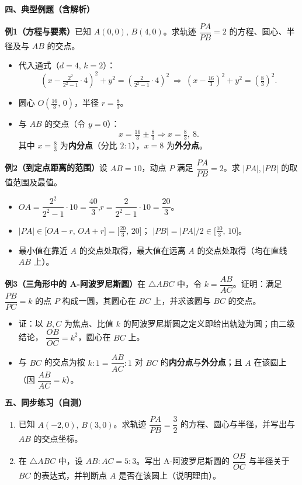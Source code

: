 \documentclass{article}
\begin{document}
   \textbf{四、典型例题（含解析）}
   
   \textbf{例1（方程与要素）}\quad 已知 \(A(0,0),\,B(4,0)\)。求轨迹 \(\dfrac{PA}{PB}=2\) 的方程、圆心、半径及与 \(AB\) 的交点。
   \begin{itemize}
   	\item 代入通式（\(d=4,\,k=2\)）：
   	\[
   	(x-\tfrac{2^2}{2^2-1}\cdot4)^2+y^2=\left(\tfrac{2}{2^2-1}\cdot4\right)^2
   	\ \Longrightarrow\
   	(x-\tfrac{16}{3})^2+y^2=\left(\tfrac{8}{3}\right)^2.
   	\]
   	\item 圆心 \(O\!\left(\tfrac{16}{3},\,0\right)\)，半径 \(r=\tfrac{8}{3}\)。
   	\item 与 \(AB\) 的交点（令 \(y=0\)）：
   	\[
   	x=\tfrac{16}{3}\pm\tfrac{8}{3}\Rightarrow x=\tfrac{8}{3},\ 8.
   	\]
   	其中 \(x=\tfrac{8}{3}\) 为\textbf{内分点}（分比 \(2:1\)），\(x=8\) 为\textbf{外分点}。
   \end{itemize}
   
   \textbf{例2（到定点距离的范围）}\quad 设 \(AB=10\)，动点 \(P\) 满足 \(\dfrac{PA}{PB}=2\)。求 \(\lvert PA\rvert,\lvert PB\rvert\) 的取值范围及最值。
   \begin{itemize}
   	\item \(OA=\dfrac{2^2}{2^2-1}\cdot10=\dfrac{40}{3}\),\quad \(r=\dfrac{2}{2^2-1}\cdot10=\dfrac{20}{3}\)。
   	\item \(\lvert PA\rvert\in\bigl[OA-r,\,OA+r\bigr]=\bigl[\tfrac{20}{3},\,20\bigr]\)；\quad
   	\(\lvert PB\rvert=\lvert PA\rvert/2\in\bigl[\tfrac{10}{3},\,10\bigr]\)。
   	\item 最小值在靠近 \(A\) 的交点处取得，最大值在远离 \(A\) 的交点处取得（均在直线 \(AB\) 上）。
   \end{itemize}
   
   \textbf{例3（三角形中的 A-阿波罗尼斯圆）}\quad 在 \(\triangle ABC\) 中，令 \(k=\dfrac{AB}{AC}\)。证明：满足 \(\dfrac{PB}{PC}=k\) 的点 \(P\) 构成一圆，其圆心在 \(BC\) 上，并求该圆与 \(BC\) 的交点。
   \begin{itemize}
   	\item 证：以 \(B,C\) 为焦点、比值 \(k\) 的阿波罗尼斯圆之定义即给出轨迹为圆；由二级结论，
   	\(\dfrac{OB}{OC}=k^2\)，圆心在 \(BC\) 上。
   	\item 与 \(BC\) 的交点为按 \(k:1=\dfrac{AB}{AC}:1\) 对 \(BC\) 的\textbf{内分点}与\textbf{外分点}；且 \(A\) 在该圆上（因 \(\dfrac{AB}{AC}=k\)）。
   \end{itemize}
   
   \textbf{五、同步练习（自测）}
   \begin{enumerate}
   	\item 已知 \(A(-2,0),\,B(3,0)\)。求轨迹 \(\dfrac{PA}{PB}=\dfrac{3}{2}\) 的方程、圆心与半径，并写出与 \(AB\) 的交点坐标。
   	\item 在 \(\triangle ABC\) 中，设 \(AB:AC=5:3\)。写出 A-阿波罗尼斯圆的 \(\dfrac{OB}{OC}\) 与半径关于 \(BC\) 的表达式，并判断点 \(A\) 是否在该圆上（说明理由）。
   \end{enumerate}
   
\end{document}
